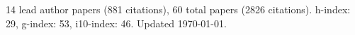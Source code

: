 14 lead author papers (881 citations),
60 total papers (2826 citations).\newline
h-index: 29, g-index: 53, i10-index: 46. Updated \today.